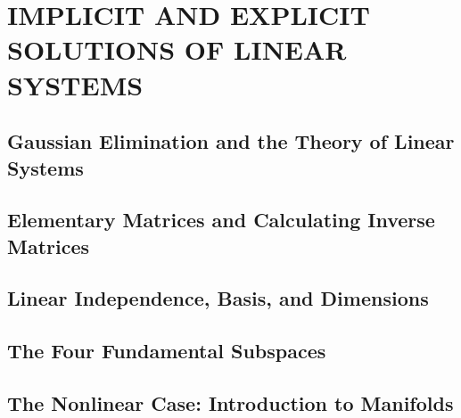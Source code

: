\section{IMPLICIT AND EXPLICIT SOLUTIONS OF LINEAR SYSTEMS}
\subsection{Gaussian Elimination and the Theory of Linear Systems}
\subsection{Elementary Matrices and Calculating Inverse Matrices}
\subsection{Linear Independence, Basis, and Dimensions}
\subsection{The Four Fundamental Subspaces}
\subsection{The Nonlinear Case: Introduction to Manifolds}
